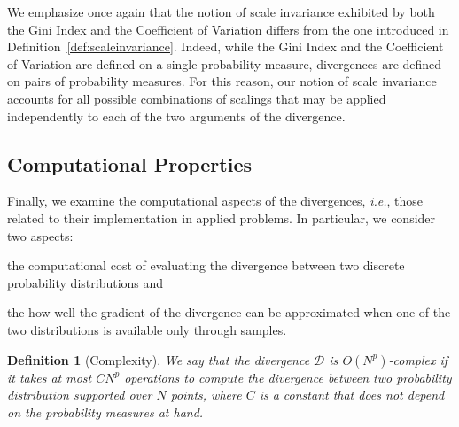 \documentclass{article}
\newtheorem{definition}{Definition}
\begin{document}
% 
We emphasize once again that the notion of scale invariance exhibited by both the Gini Index and the Coefficient of Variation differs from the one introduced in Definition~\ref{def:scaleinvariance}.
%
Indeed, while the Gini Index and the Coefficient of Variation are defined on a single probability measure, divergences are defined on pairs of probability measures.
%
For this reason, our notion of scale invariance accounts for all possible combinations of scalings that may be applied independently to each of the two arguments of the divergence.
% 
% 
% 
 


\subsection{Computational Properties}

% 
Finally, we examine the computational aspects of the divergences, \textit{i.e.}, those related to their implementation in applied problems.
% 
In particular, we consider two aspects: 
\begin{enumerate*}
    \item the computational cost of evaluating the divergence between two discrete probability distributions and
    \item the how well the gradient of the divergence can be approximated when one of the two distributions is available only through samples.
\end{enumerate*}
% 
% 
% 

\begin{definition}[Complexity]
    We say that the divergence $\mathcal{D}$ is $O(N^p)$-complex if it takes at most $CN^p$ operations to compute the divergence between two probability distribution supported over $N$ points, where $C$ is a constant that does not depend on the probability measures at hand. 
\end{definition}
\end{document}
